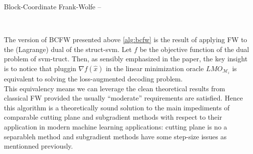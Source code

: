 \clearpage
 \begin{algorithm}[htbp!]
    \caption{Block-Coordinate Frank-Wolfe -- 
\citet{lacoste-julienBlockCoordinateFrankWolfeOptimization2013}}
    \label{alg:bcfw}
\begin{algorithmic}
\\
    \ENDFOR
\end{algorithmic}
\end{algorithm}

The version of BCFW presented above \ref{alg:bcfw} is the result of applying
FW to the (Lagrange) dual of the struct-svm. Let $f$ be the objective function
of the dual problem of svm-truct. Then, as sensibly emphasized in the paper,
the key insight is to notice that pluggin $\nabla f(\hat x)$ in the linear
minimization oracle $LMO_{\mathcal M_i}$ is equivalent to solving the
loss-augmented decoding problem. \\

This equivalency means we can leverage the clean theoretical results from
classical FW provided the usually ``moderate'' requirements are satisfied. Hence
this algorithm is a theoretically sound solution to the main impediments of
comparable cutting plane and subgradient methods with respect to their
application in modern machine learning applications: cutting plane is no a
separableh method and subgradient methods have some step-size issues as
mentionned previously.



